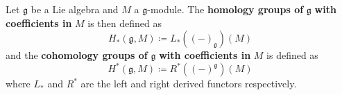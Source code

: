 \begin{definition}
  Let $ \mathfrak{g} $ be a Lie algebra and $ M $ a $ \mathfrak{g} $-module. The \textbf{homology groups of} $ \mathfrak{g} $ \textbf{with coefficients in} $ M $ is then defined as
  \begin{equation}
    H_*(\mathfrak{g}, M) \coloneqq L_*((-)_\mathfrak{g})(M)
  \end{equation}
  and the \textbf{cohomology groups of} $ \mathfrak{g} $ \textbf{with coefficients in} $ M $ is defined as
  \begin{equation}
    H^*(\mathfrak{g}, M) \coloneqq R^*((-)^\mathfrak{g})(M)
    \label{eq:cohomology}
  \end{equation}
  where $ L_* $ and $ R^* $ are the left and right derived functors respectively.
\end{definition}

